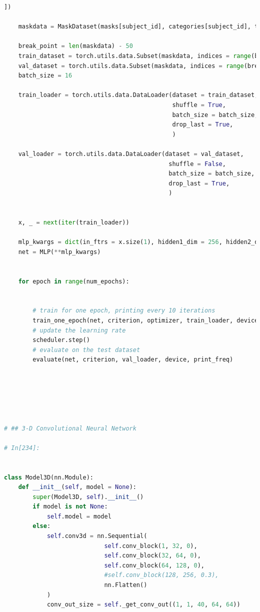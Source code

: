 \documentclass[10pt, twocolumn, letterpaper]{article}
\begin{document}
\begin{lstlisting}[language=Python]
    ])
    
    maskdata = MaskDataset(masks[subject_id], categories[subject_id], transform) 

    break_point = len(maskdata) - 50 
    train_dataset = torch.utils.data.Subset(maskdata, indices = range(break_point))
    val_dataset = torch.utils.data.Subset(maskdata, indices = range(break_point, len(maskdata)))
    batch_size = 16

    train_loader = torch.utils.data.DataLoader(dataset = train_dataset,
                                               shuffle = True,
                                               batch_size = batch_size,
                                               drop_last = True,
                                               )

    val_loader = torch.utils.data.DataLoader(dataset = val_dataset,
                                              shuffle = False,
                                              batch_size = batch_size,
                                              drop_last = True,
                                              )
    
    
    x, _ = next(iter(train_loader))
    
    mlp_kwargs = dict(in_ftrs = x.size(1), hidden1_dim = 256, hidden2_dim = 128, num_class = 8)
    net = MLP(**mlp_kwargs)


    for epoch in range(num_epochs):

    
        # train for one epoch, printing every 10 iterations
        train_one_epoch(net, criterion, optimizer, train_loader, device, epoch, print_freq, apex=False)
        # update the learning rate
        scheduler.step()
        # evaluate on the test dataset
        evaluate(net, criterion, val_loader, device, print_freq)


    
    


# ## 3-D Convolutional Neural Network

# In[234]:


class Model3D(nn.Module):
    def __init__(self, model = None):
        super(Model3D, self).__init__()
        if model is not None:
            self.model = model    
        else:
            self.conv3d = nn.Sequential(               
                            self.conv_block(1, 32, 0),
                            self.conv_block(32, 64, 0),
                            self.conv_block(64, 128, 0),
                            #self.conv_block(128, 256, 0.3),
                            nn.Flatten()
            )           
            conv_out_size = self._get_conv_out((1, 1, 40, 64, 64))


\end{lstlisting}
\end{document}
